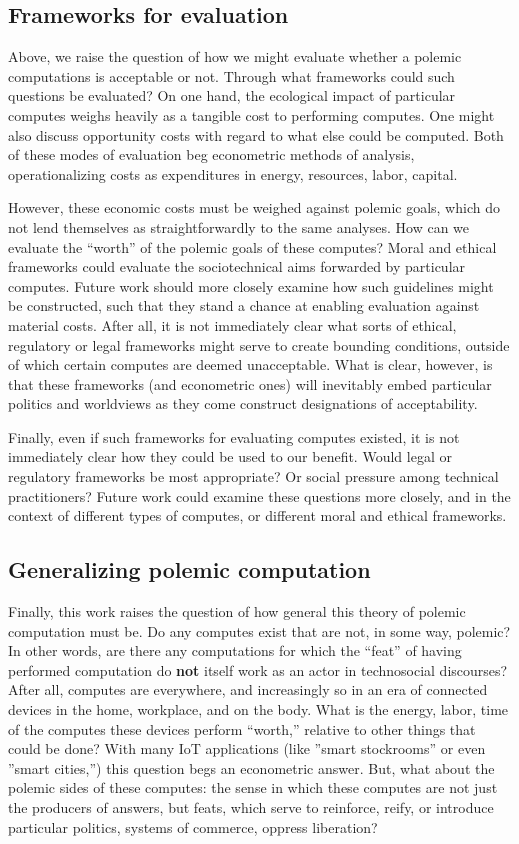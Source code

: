 \documentclass[sigconf]{acmart}
\begin{document}
\subsection{Frameworks for evaluation}
\label{sec:org1edfc31}
Above, we raise the question of how we might evaluate whether a polemic computations is acceptable or not.
Through what frameworks could such questions be evaluated? 
On one hand, the ecological impact of particular computes weighs heavily as a tangible cost to performing computes.
One might also discuss opportunity costs with regard to what else could be computed.
Both of these modes of evaluation beg econometric methods of analysis, 
operationalizing costs as expenditures in energy, resources, labor, capital.

However, these economic costs must be weighed against polemic goals, which do not lend themselves as straightforwardly to the same analyses.
How can we evaluate the ``worth'' of the polemic goals of these computes?
Moral and ethical frameworks could evaluate the sociotechnical aims forwarded by particular computes. 
Future work should more closely examine how such guidelines might be constructed, such that they stand a chance at enabling evaluation against material costs.
After all, it is not immediately clear what sorts of ethical, regulatory or legal frameworks 
might serve to create bounding conditions, outside of which certain computes are deemed unacceptable.
What is clear, however, is that these frameworks (and econometric ones) will inevitably
embed particular politics and worldviews as they come construct designations of acceptability.

Finally, even if such frameworks for evaluating computes existed, it is not immediately clear how they could be used to our benefit. 
Would legal or regulatory frameworks be most appropriate?
Or social pressure among technical practitioners?
Future work could examine these questions more closely,
and in the context of different types of computes, or different moral and ethical frameworks.


\subsection{Generalizing polemic computation}
\label{sec:orgc0f2007}
Finally, this work raises the question of how general this theory of polemic computation must be.
Do any computes exist that are not, in some way, polemic?
In other words, are there any computations for which the ``feat'' of having performed computation do \textbf{not} itself work as an actor in technosocial discourses?
After all, computes are everywhere, and increasingly so in an era of connected devices in the home, workplace, and on the body. 
What is the energy, labor, time of the computes these devices perform ``worth,'' relative to other things that could be done?
With many IoT applications (like ''smart stockrooms'' or even ''smart cities,'') this question begs an econometric answer.
But, what about the polemic sides of these computes: the sense in which these computes are not just the producers of answers, but feats, which serve to reinforce, reify, or introduce particular politics, systems of commerce, oppress liberation?
\end{document}
